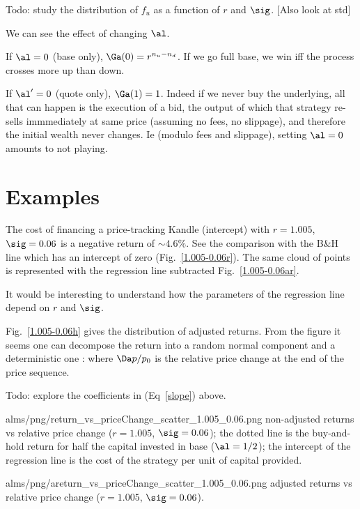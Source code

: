 \documentclass[oneside,12pt]{article}
\begin{document}
Todo: study the distribution of $f_u$ as a function of $r$ and $\sig$. [Also look at std]

We can see the effect of changing $\al$.

If $\al=0$ (base only), $\Ga(0) = r^{n_u-n_d}$. If we go full base,
we win iff the process crosses more up than down.

If $\al'=0$ (quote only), $\Ga(1) = 1$. Indeed if we never buy the underlying,
all that can happen is the execution of a bid, 
the output of which that strategy re-sells immmediately at same price (assuming no fees, no slippage),
and therefore the initial wealth never changes. Ie (modulo fees and slippage), setting $\al=0$ amounts to not playing.


\section{Examples}
The cost of financing a price-tracking Kandle (intercept) with $r=1.005$, $\sig=0.06$ is a negative return of 
$\sim 4.6\%$. See the comparison with the B\&H line which has an intercept of zero (Fig.~\ref{1.005-0.06r}).
The same cloud of points is represented with the regression line subtracted Fig.~\ref{1.005-0.06ar}.

It would be interesting to understand how the parameters of the regression line depend on $r$ and $\sig$.

Fig.~\ref{1.005-0.06h} gives the distribution of adjusted returns. 
From the figure it seems one can decompose the return into a random normal component
and a deterministic one      :
where $\Da p/p_0$ is the relative price change at the end of the price sequence.

Todo: explore the coefficients in (Eq~\ref{slope}) above.

\IG{420pt}
{alms/png/return_vs_priceChange_scatter_1.005_0.06.png}
{\label{1.005-0.06r} non-adjusted returns vs relative price change ($r=1.005$, $\sig=0.06$); the dotted line is the buy-and-hold
return for half the capital invested in base ($\al=1/2$); the intercept of the regression line 
is the cost of the strategy per unit of capital provided.}

\IG{420pt}
{alms/png/areturn_vs_priceChange_scatter_1.005_0.06.png}
{\label{1.005-0.06ar} adjusted returns vs relative price change ($r=1.005$, $\sig=0.06$).}
\end{document}
